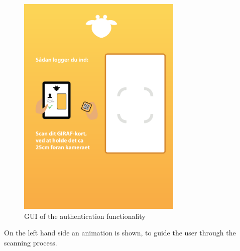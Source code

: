 \begin{figure}[!h]
	\centering
	\includegraphics[width=0.7\textwidth]{gfx/authentication_gui_design_init.pdf}
	\caption{GUI of the authentication functionality}
	\label{fig:authentication_gui_design_init}
\end{figure}

On the left hand side an animation is shown, to guide the user through the scanning process. 